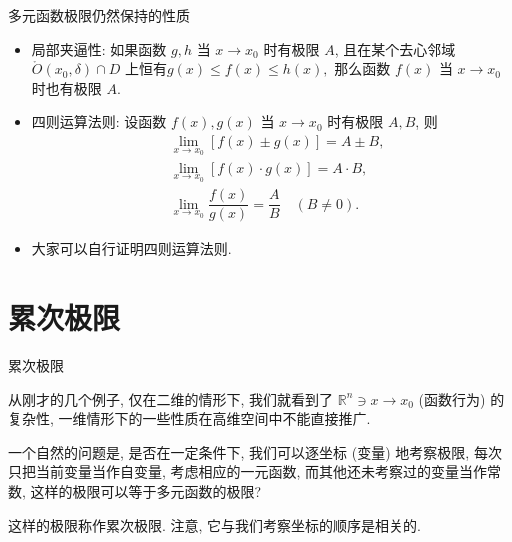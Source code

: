 
\begin{frame}{多元函数极限仍然保持的性质}

\begin{itemize}[<+->]
\item 局部夹逼性: 如果函数 $g, h$ 当 $x \to x_0$ 时有极限 $A$, 且在某个去心邻域 $\mathring{O}(x_0, \delta) \cap D$ 上恒有$g(x) \leqslant f(x) \leqslant h(x),$ 那么函数 $f(x)$ 当 $x \to x_0$ 时也有极限 $A$.
\item 四则运算法则: 设函数 $f(x), g(x)$ 当 $x \to x_0$ 时有极限 $A, B$, 则
\begin{align*}
& \lim_{x \to x_0} [f(x) \pm g(x)] = A \pm B, \\
& \lim_{x \to x_0} [f(x) \cdot g(x)] = A \cdot B, \\
& \lim_{x \to x_0} \dfrac{f(x)}{g(x)} = \dfrac{A}{B} \quad (B \neq 0).
\end{align*}

\item[] 大家可以自行证明四则运算法则.
\end{itemize}

\end{frame}


\section{累次极限}


\begin{frame}{累次极限}

从刚才的几个例子, 仅在二维的情形下, 我们就看到了 $\mathbb{R}^n \ni x \to x_0$ (函数行为) 的复杂性, 一维情形下的一些性质在高维空间中不能直接推广.

\pause
\vspace{0.5em}

一个自然的问题是, 是否在{\color{red}一定条件下}, 我们可以逐坐标 (变量) 地考察极限, 每次只把当前变量当作自变量, 考虑相应的一元函数, 而其他还未考察过的变量当作常数, 这样的极限可以等于多元函数的极限?

\vspace{0.5em}

这样的极限称作{\color{red}累次极限}. 注意, 它与我们考察坐标的顺序是相关的.

\end{frame}

